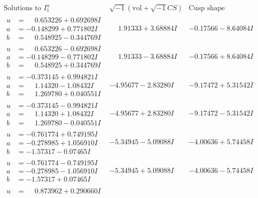 \documentclass[1p]{elsarticle_modified}
\theoremstyle{definition}
\newcommand{\I}{\sqrt{-1}}
\begin{document}
$$\begin{array}{c|c|c}  
\text{Solutions to }I^u_{1}& \I (\text{vol} + \sqrt{-1}CS) & \text{Cusp shape}\\
 \hline 
\begin{aligned}
u &= \phantom{-}0.653226 + 0.692698 I \\
a &= -0.148299 + 0.771802 I \\
b &= \phantom{-}0.548925 - 0.344769 I\end{aligned}
 & \phantom{-}1.91333 + 3.68884 I & -0.17566 - 8.64084 I \\ \hline\begin{aligned}
u &= \phantom{-}0.653226 - 0.692698 I \\
a &= -0.148299 - 0.771802 I \\
b &= \phantom{-}0.548925 + 0.344769 I\end{aligned}
 & \phantom{-}1.91333 - 3.68884 I & -0.17566 + 8.64084 I \\ \hline\begin{aligned}
u &= -0.373145 + 0.994821 I \\
a &= \phantom{-}1.14320 - 1.08432 I \\
b &= \phantom{-}1.269780 + 0.040551 I\end{aligned}
 & -4.95677 - 2.83280 I & -9.17472 + 5.31542 I \\ \hline\begin{aligned}
u &= -0.373145 - 0.994821 I \\
a &= \phantom{-}1.14320 + 1.08432 I \\
b &= \phantom{-}1.269780 - 0.040551 I\end{aligned}
 & -4.95677 + 2.83280 I & -9.17472 - 5.31542 I \\ \hline\begin{aligned}
u &= -0.761774 + 0.749195 I \\
a &= -0.278985 + 1.056910 I \\
b &= -1.57317 - 0.07465 I\end{aligned}
 & -5.34945 - 5.09088 I & -4.00636 + 5.74458 I \\ \hline\begin{aligned}
u &= -0.761774 - 0.749195 I \\
a &= -0.278985 - 1.056910 I \\
b &= -1.57317 + 0.07465 I\end{aligned}
 & -5.34945 + 5.09088 I & -4.00636 - 5.74458 I \\ \hline\begin{aligned}
u &= \phantom{-}0.873962 + 0.290660 I \\

\end{aligned}
\end{array}$$
\end{document}
